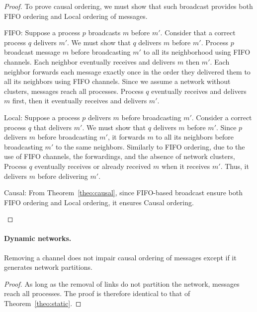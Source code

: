 \begin{proof} To prove causal ordering, we must show that such broadcast
provides both FIFO ordering and Local ordering of messages.
\begin{asparadesc}
\item [FIFO:] Suppose a process $p$ broadcasts $m$ before $m'$. Consider that a
  correct process $q$ delivers $m'$. We must show that $q$ delivers $m$ before
  $m'$. Process $p$ broadcast message $m$ before broadcasting $m'$ to all its
  neighborhood using FIFO channels. Each neighbor eventually receives and
  delivers $m$ then $m'$. Each neighbor forwards each message exactly once in
  the order they delivered them to all its neighbors using FIFO channels. Since
  we assume a network without clusters, messages reach all processes. Process
  $q$ eventually receives and delivers $m$ first, then it eventually receives
  and delivers $m'$.
\item [Local:] Suppose a process $p$ delivers $m$ before broadcasting
  $m'$. Consider a correct process $q$ that delivers $m'$. We must show that $q$
  delivers $m$ before $m'$. Since $p$ delivers $m$ before broadcasting $m'$, it
  forwards $m$ to all its neighbors before broadcasting $m'$ to the same
  neighbors. Similarly to FIFO ordering, due to the use of FIFO channels, the
  forwardings, and the absence of network clusters, Process $q$ eventually
  receives or already received $m$ when it receives $m'$. Thus, it delivers $m$
  before delivering $m'$.
\item [Causal:] From Theorem~\ref{theo:causal}, since FIFO-based broadcast ensure
  both FIFO ordering and Local ordering, it ensures Causal ordering.
\end{asparadesc}
\end{proof}




\paragraph{Dynamic networks.} Removing a channel does not impair causal ordering
of messages except if it generates network partitions. 

\begin{theorem}
\end{theorem}

\begin{proof}
  As long as the removal of links do not partition the network, messages reach
  all processes. The proof is therefore identical to that of
  Theorem~\ref{theo:static}.
\end{proof}

